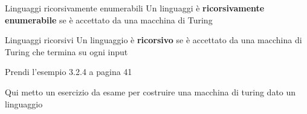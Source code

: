 \documentclass[12pt, a4paper]{report}
\begin{document}
            \begin{definitionbox}{Linguaggi ricorsivamente enumerabili}{}
                Un linguaggi è \textbf{ricorsivamente enumerabile} se è accettato da una macchina di Turing
            \end{definitionbox}
            \begin{definitionbox}{Linguaggi ricorsivi}{}
                Un linguaggio è \textbf{ricorsivo} se è accettato da una macchina di Turing che termina su ogni input
            \end{definitionbox}
            \begin{example}
                Prendi l'esempio 3.2.4 a pagina 41
            \end{example}
            \begin{exercise}
                Qui metto un esercizio da esame per costruire una macchina di turing dato un linguaggio
            \end{exercise}        
\end{document}
